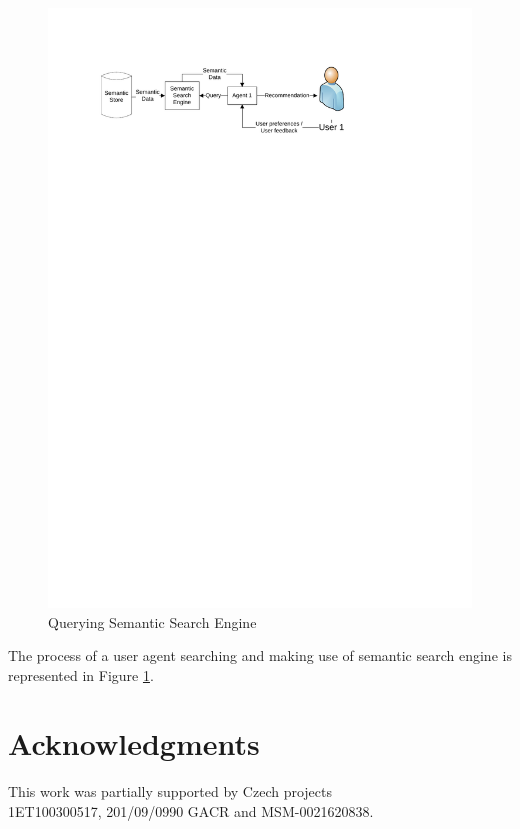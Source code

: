 \documentclass{www2009-submission}
\begin{document}
\begin{figure}
\centering
\includegraphics[width=\hsize, height=.3\hsize]{img/UserSearch}
\caption{Querying Semantic Search Engine}
\label{img:UserSearch}
\end{figure}
 
The process of a user agent searching and making use of semantic search engine is represented in Figure \ref{img:UserSearch}.






\section{Acknowledgments}
This work was partially supported by Czech projects\\1ET100300517, 201/09/0990 GACR and MSM-0021620838.

%



\balancecolumns %
\end{document}
